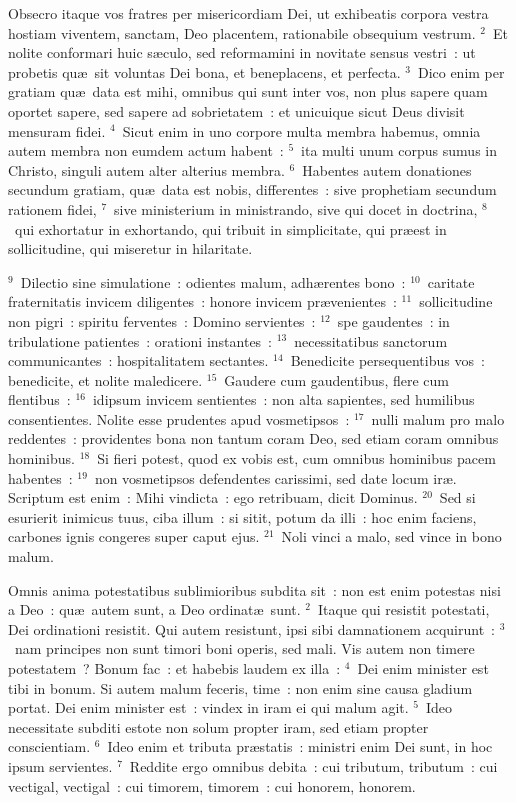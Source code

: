 \lettrine[lines=3,image=true,loversize=0.05,lraise=-0.03]{O}{}bsecro itaque vos fratres per misericordiam Dei, ut exhibeatis corpora vestra hostiam viventem, sanctam, Deo placentem, rationabile obsequium vestrum.
${}^{2}$~Et nolite conformari huic s\ae culo, sed reformamini in novitate sensus vestri~: ut probetis qu\ae\ sit voluntas Dei bona, et beneplacens, et perfecta.
${}^{3}$~Dico enim per gratiam qu\ae\ data est mihi, omnibus qui sunt inter vos, non plus sapere quam oportet sapere, sed sapere ad sobrietatem~: et unicuique sicut Deus divisit mensuram fidei.
${}^{4}$~Sicut enim in uno corpore multa membra habemus, omnia autem membra non eumdem actum habent~:
${}^{5}$~ita multi unum corpus sumus in Christo, singuli autem alter alterius membra.
${}^{6}$~Habentes autem donationes secundum gratiam, qu\ae\ data est nobis, differentes~: sive prophetiam secundum rationem fidei,
${}^{7}$~sive ministerium in ministrando, sive qui docet in doctrina,
${}^{8}$~qui exhortatur in exhortando, qui tribuit in simplicitate, qui pr\ae est in sollicitudine, qui miseretur in hilaritate.


${}^{9}$~Dilectio sine simulatione~: odientes malum, adh\ae rentes bono~:
${}^{10}$~caritate fraternitatis invicem diligentes~: honore invicem pr\ae venientes~:
${}^{11}$~sollicitudine non pigri~: spiritu ferventes~: Domino servientes~:
${}^{12}$~spe gaudentes~: in tribulatione patientes~: orationi instantes~:
${}^{13}$~necessitatibus sanctorum communicantes~: hospitalitatem sectantes.
${}^{14}$~Benedicite persequentibus vos~: benedicite, et nolite maledicere.
${}^{15}$~Gaudere cum gaudentibus, flere cum flentibus~:
${}^{16}$~idipsum invicem sentientes~: non alta sapientes, sed humilibus consentientes. Nolite esse prudentes apud vosmetipsos~:
${}^{17}$~nulli malum pro malo reddentes~: providentes bona non tantum coram Deo, sed etiam coram omnibus hominibus.
${}^{18}$~Si fieri potest, quod ex vobis est, cum omnibus hominibus pacem habentes~:
${}^{19}$~non vosmetipsos defendentes carissimi, sed date locum ir\ae . Scriptum est enim~: Mihi vindicta~: ego retribuam, dicit Dominus.
${}^{20}$~Sed si esurierit inimicus tuus, ciba illum~: si sitit, potum da illi~: hoc enim faciens, carbones ignis congeres super caput ejus.
${}^{21}$~Noli vinci a malo, sed vince in bono malum.

\lettrine[lines=3,image=true,loversize=0.05,lraise=-0.03]{O}{}mnis anima potestatibus sublimioribus subdita sit~: non est enim potestas nisi a Deo~: qu\ae\ autem sunt, a Deo ordinat\ae\ sunt.
${}^{2}$~Itaque qui resistit potestati, Dei ordinationi resistit. Qui autem resistunt, ipsi sibi damnationem acquirunt~:
${}^{3}$~nam principes non sunt timori boni operis, sed mali. Vis autem non timere potestatem~? Bonum fac~: et habebis laudem ex illa~:
${}^{4}$~Dei enim minister est tibi in bonum. Si autem malum feceris, time~: non enim sine causa gladium portat. Dei enim minister est~: vindex in iram ei qui malum agit.
${}^{5}$~Ideo necessitate subditi estote non solum propter iram, sed etiam propter conscientiam.
${}^{6}$~Ideo enim et tributa pr\ae statis~: ministri enim Dei sunt, in hoc ipsum servientes.
${}^{7}$~Reddite ergo omnibus debita~: cui tributum, tributum~: cui vectigal, vectigal~: cui timorem, timorem~: cui honorem, honorem.


